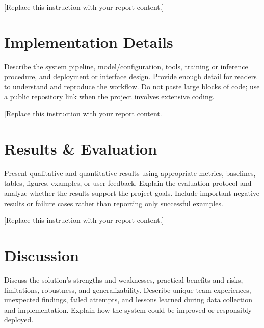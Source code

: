 \documentclass{article}
\begin{document}
[Replace this instruction with your report content.]

\section{Implementation Details}
Describe the system pipeline, model/configuration, tools, training or inference procedure, and deployment or interface design. Provide enough detail for readers to understand and reproduce the workflow. Do not paste large blocks of code; use a public repository link when the project involves extensive coding.


[Replace this instruction with your report content.]

\section{Results \& Evaluation}
Present qualitative and quantitative results using appropriate metrics, baselines, tables, figures, examples, or user feedback. Explain the evaluation protocol and analyze whether the results support the project goals. Include important negative results or failure cases rather than reporting only successful examples.


[Replace this instruction with your report content.]

\section{Discussion}
Discuss the solution's strengths and weaknesses, practical benefits and risks, limitations, robustness, and generalizability. Describe unique team experiences, unexpected findings, failed attempts, and lessons learned during data collection and implementation. Explain how the system could be improved or responsibly deployed.
\end{document}

